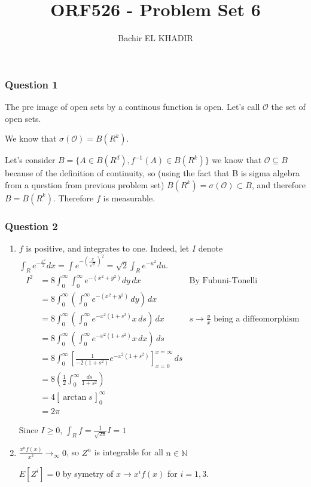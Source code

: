 \documentclass[12pt]{article}
\title{ORF526 - Problem Set 6}
\author{Bachir EL KHADIR }
\newcommand{\Q}[1]{\subsubsection*{Question #1}}
\begin{document}
\maketitle

\Q{1} 
The pre image of open sets by a continous function is open. 
Let's call $\mathcal O$ the set of open sets.

We know that $\sigma(\mathcal O) = B(R^k)$.


Let's consider $B = \{ A \in B(R^d), f^{-1}(A) \in B(R^k)\}$
we know that $\mathcal O \subseteq B$ because of the definition of continuity, so (using the fact that B is sigma algebra from a question from previous problem set) $B(R^k) = \sigma(\mathcal O) \subset B$, and therefore $B = B(R^k)$.
Therefore $f$ is measurable.

\Q{2}

\begin{enumerate}[label=\alph*.]

\item
$f$ is positive, and integrates to one. 
Indeed, let $I$ denote $\int_R e^{-\frac{x^2}{2}} dx = \int e^{-(\frac x {\sqrt 2})^2} = \sqrt{2} \int_R e^{-u^2} du$.
\begin{align}
I^2 &= 8 \int_0^\infty \int_0^\infty e^{-(x^2 + y^2)} dy\,dx &\text{By Fubuni-Tonelli}\\
&= 8 \int_0^\infty \left( \int_0^\infty e^{-(x^2 + y^2)} \, dy \right) \, dx \\
&= 8 \int_0^\infty \left( \int_0^\infty e^{-x^2(1+s^2)} x\,ds \right) \, dx & s \rightarrow \frac{y}{x}  \text{ being a diffeomorphism} \\
&= 8 \int_0^\infty \left( \int_0^\infty e^{-x^2(1 + s^2)} x \, dx \right) \, ds \\
&= 8 \int_0^\infty \left[ \frac{1}{-2(1+s^2)} e^{-x^2(1+s^2)} \right]_{x=0}^{x=\infty} \, ds \\
&= 8 \left (\tfrac{1}{2} \int_0^\infty \frac{ds}{1+s^2}  \right ) \\
&= 4 \left [ \arctan s \frac{}{} \right ]_0^\infty \\
&= 2 \pi
\end{align}

Since $I \geq 0$,  $\int_R f = \frac{1}{\sqrt{2\pi}} I = 1$

\item 

$\frac{x^n f(x)}{x^2} \rightarrow_{\infty} 0$, so $Z^n$ is integrable for all $n \in \mathbb{N}$


$E[Z^i] = 0$ by symetry of $x \rightarrow x^i f(x)$ for $i = 1, 3$.


\end{enumerate}
\end{document}
